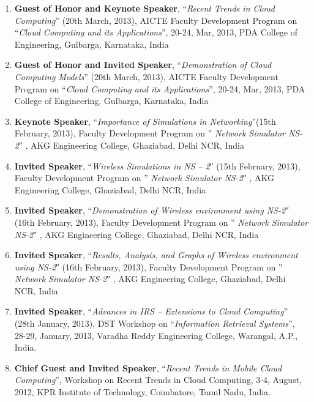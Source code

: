 \begin{enumerate}
\item
\textbf{Guest of Honor and Keynote Speaker}, “\textit{Recent Trends in Cloud Computing}” (20th March, 2013), AICTE Faculty Development Program on “\textit{Cloud Computing and its Applications}”, 20-24, Mar, 2013, PDA College of Engineering, Gulbarga, Karnataka, India

\item
\textbf{Guest of Honor and Invited Speaker}, “\textit{Demonstration of Cloud Computing Models}” (20th March, 2013), AICTE Faculty Development Program on “\textit{Cloud Computing and its Applications}”, 20-24, Mar, 2013, PDA College of Engineering, Gulbarga, Karnataka, India

\item
\textbf{Keynote Speaker}, “\textit{Importance of Simulations in Networking}”(15th February, 2013), Faculty Development Program on ” \textit{Network Simulator NS-2}″ , AKG Engineering College, Ghaziabad, Delhi NCR, India

\item
\textbf{Invited Speaker}, “\textit{Wireless Simulations in NS – 2}″ (15th February, 2013), Faculty Development Program on ” \textit{Network Simulator NS-2}″ , AKG Engineering College, Ghaziabad, Delhi NCR, India

\item
\textbf{Invited Speaker}, “\textit{Demonstration of Wireless environment using NS-2}″ (16th February, 2013), Faculty Development Program on ” \textit{Network Simulator NS-2}″ , AKG Engineering College, Ghaziabad, Delhi NCR, India

\item
\textbf{Invited Speaker}, “\textit{Results, Analysis, and Graphs of Wireless environment using NS-2}″ (16th February, 2013), Faculty Development Program on ” \textit{Network Simulator NS-2}″ , AKG Engineering College, Ghaziabad, Delhi NCR, India

\item
\textbf{Invited Speaker}, “\textit{Advances in IRS – Extensions to Cloud Computing}” (28th January, 2013), DST Workshop on “\textit{Information Retrieval Systems}”, 28-29, January, 2013, Varadha Reddy Engineering College, Warangal, A.P., India.

\item
\textbf{Chief Guest and Invited Speaker}, “\textit{Recent Trends in Mobile Cloud Computing}”, Workshop on Recent Trends in Cloud Computing, 3-4, August, 2012, KPR Institute of Technology, Coimbatore, Tamil Nadu, India.


\end{enumerate}
